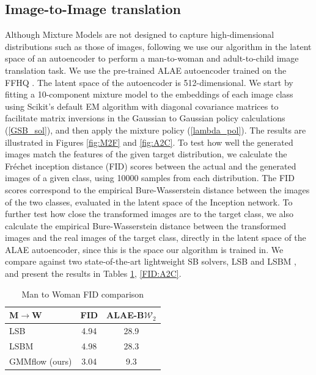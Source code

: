 \documentclass[twoside]{article}
\renewcommand{\eqref}[1]{(\ref{#1})}
\begin{document}
\subsection{Image-to-Image translation} \label{I2I_trans}
%
%
Although Mixture Models are not designed to capture high-dimensional distributions such as those of images, following \citep{korotin2024light} we use our algorithm in the latent space of an autoencoder to perform a man-to-woman and adult-to-child image translation task. 
We use the pre-trained ALAE autoencoder \citep{pidhorskyi2020adversarial} trained on the FFHQ \citep{karras2019style}.
The latent space of the autoencoder is 512-dimensional.
We start by fitting a 10-component mixture model to the embeddings of each image class using Scikit's \citep{pedregosa2011scikit} default EM algorithm with diagonal covariance matrices to facilitate matrix inversions in the Gaussian to Gaussian policy calculations \eqref{GSB_sol}, and then apply the mixture policy \eqref{lambda_pol}. 
The results are illustrated in Figures \ref{fig:M2F} and \ref{fig:A2C}.
To test how well the generated images match the features of the given target distribution, we calculate the Fréchet inception distance (FID) scores \cite{heusel2017gans} between the actual and the generated images of a given class, using 10000 samples from each distribution.
The FID scores correspond to the empirical Bure-Wasserstein distance between the images of the two classes, evaluated in the latent space of the Inception network. 
To further test how close the transformed images are to the target class, we also calculate the empirical Bure-Wasserstein distance between the transformed images and the real images of the target class, directly in the latent space of the ALAE autoencoder, since this is the space our algorithm is trained in.
We compare against two state-of-the-art lightweight SB solvers, LSB \cite{korotin2024light} and LSBM \cite{gushchin24light}, and present the results in Tables \ref{FID:M2W}, \ref{FID:A2C}.
\begin{table}[!ht]
    \centering
    \begin{tabular}{l|cc}
        M$\rightarrow$W &  FID  &   ALAE-B$\mathcal{W}_2$  \\
        \hline
        LSB             &  4.94     & 28.9  \\
        LSBM            &  4.98     & 28.3  \\
        GMMflow (ours)  &  3.04     & 9.3   \\
    \end{tabular}
    \caption{Man to Woman FID comparison}
    \label{FID:M2W}
\end{table}
\end{document}
